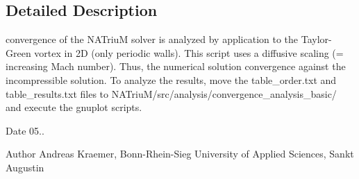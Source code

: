 \subsection{Detailed Description}
convergence of the N\-A\-Triu\-M solver is analyzed by application to the Taylor-\/\-Green vortex in 2\-D (only periodic walls). This script uses a diffusive scaling (= increasing Mach number). Thus, the numerical solution convergence against the incompressible solution. To analyze the results, move the table\-\_\-order.\-txt and table\-\_\-results.\-txt files to N\-A\-Triu\-M/src/analysis/convergence\-\_\-analysis\-\_\-basic/ and execute the gnuplot scripts. \begin{DoxyDate}{Date}
05.. 
\end{DoxyDate}
\begin{DoxyAuthor}{Author}
Andreas Kraemer, Bonn-\/\-Rhein-\/\-Sieg University of Applied Sciences, Sankt Augustin 
\end{DoxyAuthor}
